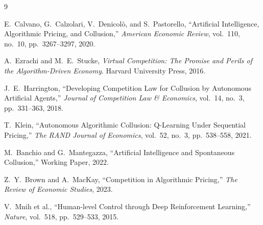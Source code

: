 \documentclass[11pt]{article}
\begin{document}
\begin{thebibliography}{9}

E.~Calvano, G.~Calzolari, V.~Denicolò, and S.~Pastorello,
``Artificial Intelligence, Algorithmic Pricing, and Collusion,''
\emph{American Economic Review}, vol.~110, no.~10, pp.~3267--3297, 2020.

A.~Ezrachi and M.~E.~Stucke,
\emph{Virtual Competition: The Promise and Perils of the Algorithm-Driven Economy}.
Harvard University Press, 2016.

J.~E.~Harrington,
``Developing Competition Law for Collusion by Autonomous Artificial Agents,''
\emph{Journal of Competition Law \& Economics}, vol.~14, no.~3, pp.~331--363, 2018.

T.~Klein,
``Autonomous Algorithmic Collusion: Q-Learning Under Sequential Pricing,''
\emph{The RAND Journal of Economics}, vol.~52, no.~3, pp.~538--558, 2021.

M.~Banchio and G.~Mantegazza,
``Artificial Intelligence and Spontaneous Collusion,''
Working Paper, 2022.

Z.~Y.~Brown and A.~MacKay,
``Competition in Algorithmic Pricing,''
\emph{The Review of Economic Studies}, 2023.

V.~Mnih et al.,
``Human-level Control through Deep Reinforcement Learning,''
\emph{Nature}, vol.~518, pp.~529--533, 2015.

\end{thebibliography}
\end{document}
